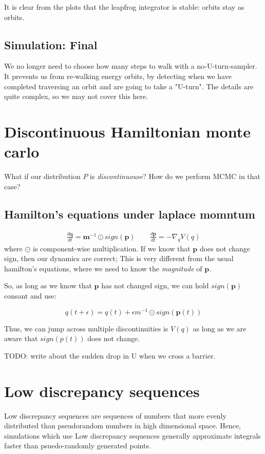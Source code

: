 \documentclass[titlepage]{article}
\newcommand{\p}{\mathbf{p}}
\newcommand{\q}{\mathbf{q}}
\newcommand{\m}{\mathbf{m}}
\begin{document}
It is clear from the plots that the leapfrog integrator is stable: orbits
stay as orbits. 


\subsection{Simulation: Final}


We no longer need to choose how many steps to walk with a no-U-turn-sampler.
It prevents us from re-walking energy orbits, by detecting when we have completed
traversing an orbit and are going to take a "U-turn". The details are quite
complex, so we may not cover this here.

\section{Discontinuous Hamiltonian monte carlo}

What if our distribution $P$ is \emph{discontinuouse}? How do we perform MCMC
in that case?

\subsection{Hamilton's equations under laplace momntum}

\begin{align*}
    \frac{d \q}{dt} = \m^{-1} \odot sign(\p) \qquad \frac{d \p}{dt} = - \nabla_q V(q)
\end{align*}
where $\odot$ is component-wise multiplication. If we know that $\p$ does
not change sign, then our dynamics are correct; This is very different from
the usual hamilton's equations, where we need to know the \emph{magnitude}
of $\p$.

So, as long as we know that $\p$ has not changed sign, we can hold $sign(\p)$
consant and use:

$$
q(t + \epsilon) = q(t) + \epsilon m^{-1} \odot sign(\p(t))
$$

Thus, we can jump across multiple discontinuities is $V(q)$ as long as we are
aware that $sign(p(t))$ does not change.

TODO: write about the sudden drop in U when we cross a barrier.

\section{Low discrepancy sequences}
Low discrepancy sequences are sequences of numbers that more evenly
distributed than pseudorandom numbers in high dimensional space. Hence,
simulations which use Low discrepancy sequences generally approximate
integrals faster than psuedo-randomly generated points.
\end{document}
